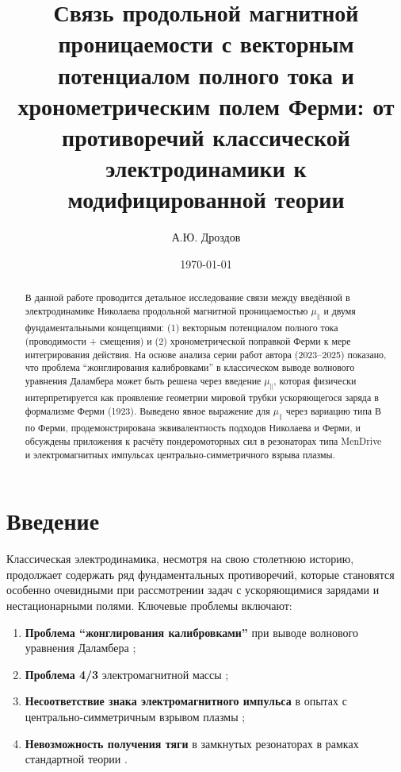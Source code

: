 \documentclass[12pt, a4paper]{article}
\title{Связь продольной магнитной проницаемости с векторным потенциалом полного тока и хронометрическим полем Ферми: от противоречий классической электродинамики к модифицированной теории}
\author{А.Ю. Дроздов}
\date{\today}
\begin{document}
\maketitle

\begin{abstract}
В данной работе проводится детальное исследование связи между введённой в электродинамике Николаева продольной магнитной проницаемостью $\mu_{\parallel}$ и двумя фундаментальными концепциями: (1) векторным потенциалом полного тока (проводимости + смещения) и (2) хронометрической поправкой Ферми к мере интегрирования действия. На основе анализа серии работ автора (2023--2025) показано, что проблема ``жонглирования калибровками'' в классическом выводе волнового уравнения Даламбера может быть решена через введение $\mu_{\parallel}$, которая физически интерпретируется как проявление геометрии мировой трубки ускоряющегося заряда в формализме Ферми (1923). Выведено явное выражение для $\mu_{\parallel}$ через вариацию типа В по Ферми, продемонстрирована эквивалентность подходов Николаева и Ферми, и обсуждены приложения к расчёту пондеромоторных сил в резонаторах типа MenDrive и электромагнитных импульсах центрально-симметричного взрыва плазмы.
\end{abstract}

\section{Введение}

Классическая электродинамика, несмотря на свою столетнюю историю, продолжает содержать ряд фундаментальных противоречий, которые становятся особенно очевидными при рассмотрении задач с ускоряющимися зарядами и нестационарными полями. Ключевые проблемы включают:

\begin{enumerate}
    \item \textbf{Проблема ``жонглирования калибровками''} при выводе волнового уравнения Даламбера \cite{JugglingCalibrations};
    \item \textbf{Проблема 4/3} электромагнитной массы \cite{Fermi1923};
    \item \textbf{Несоответствие знака электромагнитного импульса} в опытах с центрально-симметричным взрывом плазмы \cite{PlasmaExplosion};
    \item \textbf{Невозможность получения тяги} в замкнутых резонаторах в рамках стандартной теории \cite{MenDrive}.
\end{enumerate}
\end{document}
